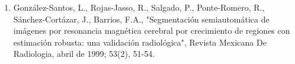 \begin{enumerate}
\item González-Santos, L., Rojas-Jasso, R., Salgado, P., Ponte-Romero, R., Sánchez-Cortázar, J., Barrios, F.A., "Segmentación semiautomática de imágenes por 
resonancia magnética cerebral por crecimiento de regiones con estimación robusta: una validación radiológica", Revista Mexicana De Radiologia, abril de 
1999; 53(2), 51-54.

\end{enumerate}

